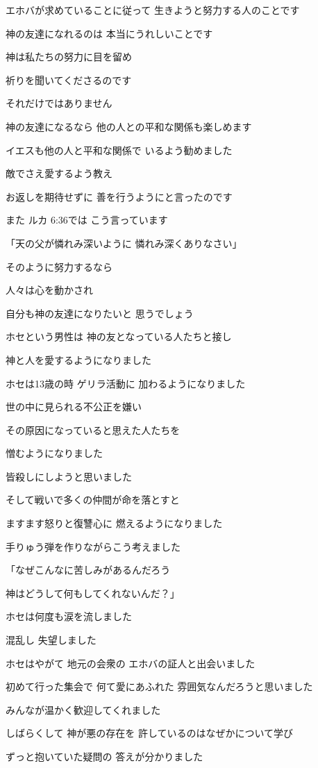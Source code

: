 \documentclass[twocolumn]{jsarticle}
\begin{document}
エホバが求めていることに従って
生きようと努力する人のことです

神の友達になれるのは
本当にうれしいことです

神は私たちの努力に目を留め

祈りを聞いてくださるのです

それだけではありません

神の友達になるなら
他の人との平和な関係も楽しめます

イエスも他の人と平和な関係で
いるよう勧めました

敵でさえ愛するよう教え

お返しを期待せずに
善を行うようにと言ったのです

また ルカ 6:36では
こう言っています

「天の父が憐れみ深いように
憐れみ深くありなさい」

そのように努力するなら

人々は心を動かされ

自分も神の友達になりたいと
思うでしょう

ホセという男性は
神の友となっている人たちと接し

神と人を愛するようになりました

ホセは13歳の時 ゲリラ活動に
加わるようになりました

世の中に見られる不公正を嫌い

その原因になっていると思えた人たちを

憎むようになりました

皆殺しにしようと思いました

そして戦いで多くの仲間が命を落とすと

ますます怒りと復讐心に
燃えるようになりました

手りゅう弾を作りながらこう考えました

「なぜこんなに苦しみがあるんだろう

神はどうして何もしてくれないんだ？」

ホセは何度も涙を流しました

混乱し 失望しました

ホセはやがて 地元の会衆の
エホバの証人と出会いました

初めて行った集会で 何て愛にあふれた
雰囲気なんだろうと思いました

みんなが温かく歓迎してくれました

しばらくして 神が悪の存在を
許しているのはなぜかについて学び

ずっと抱いていた疑問の
答えが分かりました
\end{document}
